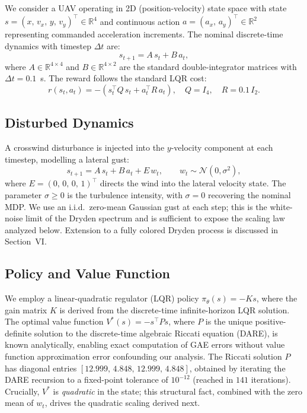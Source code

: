 \documentclass[10pt, conference]{IEEEtran}
\begin{document}
We consider a UAV operating in 2D (position-velocity) state space with
state $s = (x,\,v_x,\,y,\,v_y)^\top \in \mathbb{R}^4$ and continuous
action $a = (a_x,\,a_y)^\top \in \mathbb{R}^2$ representing commanded
acceleration increments. The nominal discrete-time dynamics with
timestep $\Delta t$ are:
\begin{equation}
  s_{t+1} = A\,s_t + B\,a_t,
\end{equation}
where $A \in \mathbb{R}^{4\times4}$ and $B \in \mathbb{R}^{4\times2}$
are the standard double-integrator matrices with $\Delta t = 0.1$~s. The
reward follows the standard LQR cost:
\begin{equation}
  r(s_t, a_t) = -(s_t^\top Q\,s_t + a_t^\top R\,a_t),
  \quad Q = I_4,\quad R = 0.1\,I_2.
\end{equation}

\subsection{Disturbed Dynamics}

A crosswind disturbance is injected into the $y$-velocity component at
each timestep, modelling a lateral gust:
\begin{equation}
  s_{t+1} = A\,s_t + B\,a_t + E\,w_t,
  \qquad w_t \sim \mathcal{N}(0,\sigma^2),
\end{equation}
where $E = (0,\,0,\,0,\,1)^\top$ directs the wind into the lateral
velocity state. The parameter $\sigma \geq 0$ is the turbulence
intensity, with $\sigma = 0$ recovering the nominal MDP. We use an
i.i.d.\ zero-mean Gaussian gust at each step; this is the white-noise
limit of the Dryden spectrum and is sufficient to expose the scaling law
analyzed below. Extension to a fully colored Dryden process is discussed
in Section~VI.

\subsection{Policy and Value Function}

We employ a linear-quadratic regulator (LQR) policy
$\pi_\theta(s) = -Ks$, where the gain matrix $K$ is derived from the
discrete-time infinite-horizon LQR solution. The optimal value function
$V^*(s) = -s^\top P s$, where $P$ is the unique positive-definite
solution to the discrete-time algebraic Riccati equation (DARE), is known
analytically, enabling exact computation of GAE errors without value
function approximation error confounding our analysis. The Riccati
solution $P$ has diagonal entries
$[12.999,\,4.848,\,12.999,\,4.848]$, obtained by iterating the DARE
recursion to a fixed-point tolerance of $10^{-12}$ (reached in $141$
iterations). Crucially, $V^*$ is \emph{quadratic} in the state; this
structural fact, combined with the zero mean of $w_t$, drives the
quadratic scaling derived next.
\end{document}
